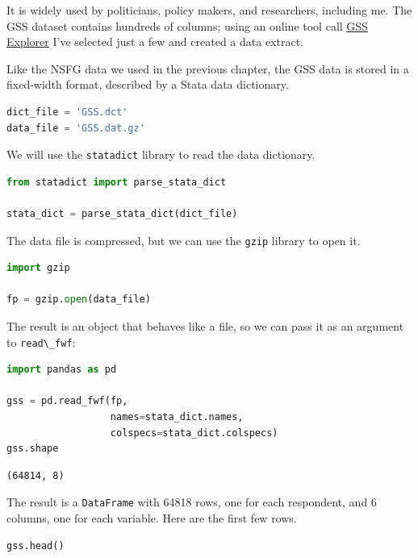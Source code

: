 It is widely used by politicians, policy makers, and researchers,
including me. The GSS dataset contains hundreds of columns; using an
online tool call \href{https://gssdataexplorer.norc.org/}{GSS Explorer}
I've selected just a few and created a data extract.

Like the NSFG data we used in the previous chapter, the GSS data is
stored in a fixed-width format, described by a Stata data dictionary.

\begin{lstlisting}[language=Python]
dict_file = 'GSS.dct'
data_file = 'GSS.dat.gz'
\end{lstlisting}

We will use the \passthrough{\lstinline!statadict!} library to read the
data dictionary.

\begin{lstlisting}[language=Python]
from statadict import parse_stata_dict

stata_dict = parse_stata_dict(dict_file)
\end{lstlisting}

The data file is compressed, but we can use the
\passthrough{\lstinline!gzip!} library to open it.

\begin{lstlisting}[language=Python]
import gzip

fp = gzip.open(data_file)
\end{lstlisting}

The result is an object that behaves like a file, so we can pass it as
an argument to \passthrough{\lstinline!read\_fwf!}:

\begin{lstlisting}[language=Python]
import pandas as pd

gss = pd.read_fwf(fp, 
                  names=stata_dict.names, 
                  colspecs=stata_dict.colspecs)
gss.shape
\end{lstlisting}

\begin{lstlisting}[]
(64814, 8)
\end{lstlisting}

The result is a \passthrough{\lstinline!DataFrame!} with 64818 rows, one
for each respondent, and 6 columns, one for each variable. Here are the
first few rows.

\begin{lstlisting}[language=Python]
gss.head()
\end{lstlisting}

